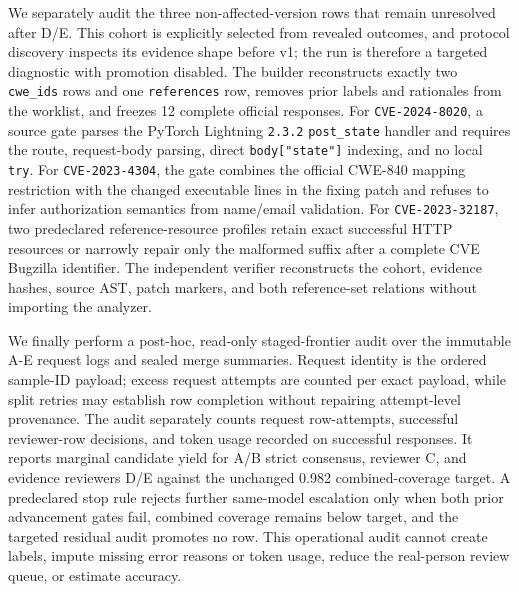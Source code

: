 We separately audit the three non-affected-version rows that remain unresolved after D/E. This cohort is explicitly selected from revealed outcomes, and protocol discovery inspects its evidence shape before v1; the run is therefore a targeted diagnostic with promotion disabled. The builder reconstructs exactly two \texttt{cwe\_ids} rows and one \texttt{references} row, removes prior labels and rationales from the worklist, and freezes 12 complete official responses. For \texttt{CVE-2024-8020}, a source gate parses the PyTorch Lightning \texttt{2.3.2} \texttt{post\_state} handler and requires the  route, request-body parsing, direct \texttt{body["state"]} indexing, and no local \texttt{try}. For \texttt{CVE-2023-4304}, the gate combines the official CWE-840 mapping restriction with the changed executable lines in the fixing patch and refuses to infer authorization semantics from name/email validation. For \texttt{CVE-2023-32187}, two predeclared reference-resource profiles retain exact successful HTTP resources or narrowly repair only the malformed suffix after a complete CVE Bugzilla identifier. The independent verifier reconstructs the cohort, evidence hashes, source AST, patch markers, and both reference-set relations without importing the analyzer.

We finally perform a post-hoc, read-only staged-frontier audit over the immutable A-E request logs and sealed merge summaries. Request identity is the ordered sample-ID payload; excess request attempts are counted per exact payload, while split retries may establish row completion without repairing attempt-level provenance. The audit separately counts request row-attempts, successful reviewer-row decisions, and token usage recorded on successful responses. It reports marginal candidate yield for A/B strict consensus, reviewer C, and evidence reviewers D/E against the unchanged 0.982 combined-coverage target. A predeclared stop rule rejects further same-model escalation only when both prior advancement gates fail, combined coverage remains below target, and the targeted residual audit promotes no row. This operational audit cannot create labels, impute missing error reasons or token usage, reduce the real-person review queue, or estimate accuracy.

